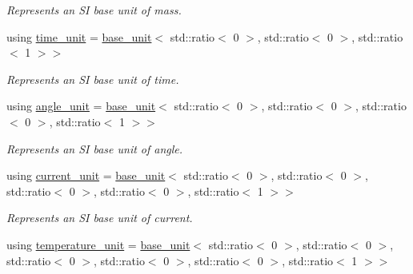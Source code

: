 \begin{DoxyCompactItemize}
\begin{DoxyCompactList}\small\item\em Represents an S\+I base unit of mass. \end{DoxyCompactList}\item 
\hypertarget{namespaceunits_1_1category_a505444228cdf173b75aeed6932d7e1a9}{}using \hyperlink{namespaceunits_1_1category_a505444228cdf173b75aeed6932d7e1a9}{time\+\_\+unit} = \hyperlink{structunits_1_1base__unit}{base\+\_\+unit}$<$ std\+::ratio$<$ 0 $>$, std\+::ratio$<$ 0 $>$, std\+::ratio$<$ 1 $>$$>$\label{namespaceunits_1_1category_a505444228cdf173b75aeed6932d7e1a9}

\begin{DoxyCompactList}\small\item\em Represents an S\+I base unit of time. \end{DoxyCompactList}\item 
\hypertarget{namespaceunits_1_1category_a7f431fefc267dd924d23fe6f3c7db3d1}{}using \hyperlink{namespaceunits_1_1category_a7f431fefc267dd924d23fe6f3c7db3d1}{angle\+\_\+unit} = \hyperlink{structunits_1_1base__unit}{base\+\_\+unit}$<$ std\+::ratio$<$ 0 $>$, std\+::ratio$<$ 0 $>$, std\+::ratio$<$ 0 $>$, std\+::ratio$<$ 1 $>$$>$\label{namespaceunits_1_1category_a7f431fefc267dd924d23fe6f3c7db3d1}

\begin{DoxyCompactList}\small\item\em Represents an S\+I base unit of angle. \end{DoxyCompactList}\item 
\hypertarget{namespaceunits_1_1category_af018d7d3f53e57d660b51d77c5e7a437}{}using \hyperlink{namespaceunits_1_1category_af018d7d3f53e57d660b51d77c5e7a437}{current\+\_\+unit} = \hyperlink{structunits_1_1base__unit}{base\+\_\+unit}$<$ std\+::ratio$<$ 0 $>$, std\+::ratio$<$ 0 $>$, std\+::ratio$<$ 0 $>$, std\+::ratio$<$ 0 $>$, std\+::ratio$<$ 1 $>$$>$\label{namespaceunits_1_1category_af018d7d3f53e57d660b51d77c5e7a437}

\begin{DoxyCompactList}\small\item\em Represents an S\+I base unit of current. \end{DoxyCompactList}\item 
\hypertarget{namespaceunits_1_1category_a3132de15d76bba5313de2ed97f8cf950}{}using \hyperlink{namespaceunits_1_1category_a3132de15d76bba5313de2ed97f8cf950}{temperature\+\_\+unit} = \hyperlink{structunits_1_1base__unit}{base\+\_\+unit}$<$ std\+::ratio$<$ 0 $>$, std\+::ratio$<$ 0 $>$, std\+::ratio$<$ 0 $>$, std\+::ratio$<$ 0 $>$, std\+::ratio$<$ 0 $>$, std\+::ratio$<$ 1 $>$$>$\label{namespaceunits_1_1category_a3132de15d76bba5313de2ed97f8cf950}


\end{DoxyCompactItemize}
